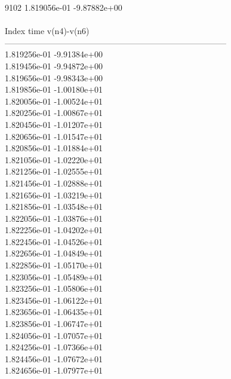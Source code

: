 9102	1.819056e-01	-9.87882e+00	\\ \hline
\\ \hline
Index   time            v(n4)-v(n6)     \\ \hline
--------------------------------------------------------------------------------\\ 	1.819256e-01	-9.91384e+00	\\ 	1.819456e-01	-9.94872e+00	\\ 	1.819656e-01	-9.98343e+00	\\ 	1.819856e-01	-1.00180e+01	\\ 	1.820056e-01	-1.00524e+01	\\ 	1.820256e-01	-1.00867e+01	\\ 	1.820456e-01	-1.01207e+01	\\ 	1.820656e-01	-1.01547e+01	\\ 	1.820856e-01	-1.01884e+01	\\ 	1.821056e-01	-1.02220e+01	\\ 	1.821256e-01	-1.02555e+01	\\ 	1.821456e-01	-1.02888e+01	\\ 	1.821656e-01	-1.03219e+01	\\ 	1.821856e-01	-1.03548e+01	\\ 	1.822056e-01	-1.03876e+01	\\ 	1.822256e-01	-1.04202e+01	\\ 	1.822456e-01	-1.04526e+01	\\ 	1.822656e-01	-1.04849e+01	\\ 	1.822856e-01	-1.05170e+01	\\ 	1.823056e-01	-1.05489e+01	\\ 	1.823256e-01	-1.05806e+01	\\ 	1.823456e-01	-1.06122e+01	\\ 	1.823656e-01	-1.06435e+01	\\ 	1.823856e-01	-1.06747e+01	\\ 	1.824056e-01	-1.07057e+01	\\ 	1.824256e-01	-1.07366e+01	\\ 	1.824456e-01	-1.07672e+01	\\ 	1.824656e-01	-1.07977e+01	\\ \hline
